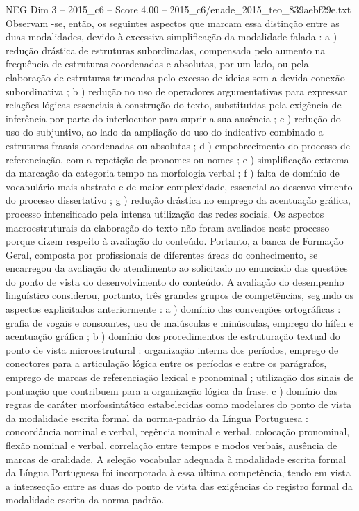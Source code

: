 \begin{textsample}{NEG Dim 3 – 2015\_c6 – Score 4.00 – 2015\_c6/enade\_2015\_teo\_839aebf29e.txt}
Observam -se, então, os seguintes aspectos que marcam essa distinção entre as duas modalidades, devido à excessiva simplificação da modalidade falada : a ) redução drástica de estruturas subordinadas, compensada pelo aumento na frequência de estruturas coordenadas e absolutas, por um lado, ou pela elaboração de estruturas truncadas pelo excesso de ideias sem a devida conexão subordinativa ; b ) redução no uso de operadores argumentativas para expressar relações lógicas essenciais à construção do texto, substituídas pela exigência de inferência por parte do interlocutor para suprir a sua ausência ; c ) redução do uso do subjuntivo, ao lado da ampliação do uso do indicativo combinado a estruturas frasais coordenadas ou absolutas ; d ) empobrecimento do processo de referenciação, com a repetição de pronomes ou nomes ; e ) simplificação extrema da marcação da categoria tempo na morfologia verbal ; f ) falta de domínio de vocabulário mais abstrato e de maior complexidade, essencial ao desenvolvimento do processo dissertativo ; g ) redução drástica no emprego da acentuação gráfica, processo intensificado pela intensa utilização das redes sociais.
Os aspectos macroestruturais da elaboração do texto não foram avaliados neste processo porque dizem respeito à avaliação do conteúdo.
Portanto, a banca de Formação Geral, composta por profissionais de diferentes áreas do conhecimento, se encarregou da avaliação do atendimento ao solicitado no enunciado das questões do ponto de vista do desenvolvimento do conteúdo.
A avaliação do desempenho linguístico considerou, portanto, três grandes grupos de competências, segundo os aspectos explicitados anteriormente : a ) domínio das convenções ortográficas : grafia de vogais e consoantes, uso de maiúsculas e minúsculas, emprego do hífen e acentuação gráfica ; b ) domínio dos procedimentos de estruturação textual do ponto de vista microestrutural : organização interna dos períodos, emprego de conectores para a articulação lógica entre os períodos e entre os parágrafos, emprego de marcas de referenciação lexical e pronominal ; utilização dos sinais de pontuação que contribuem para a organização lógica da frase. c ) domínio das regras de caráter morfossintático estabelecidas como modelares do ponto de vista da modalidade escrita formal da norma-padrão da Língua Portuguesa : concordância nominal e verbal, regência nominal e verbal, colocação pronominal, flexão nominal e verbal, correlação entre tempos e modos verbais, ausência de marcas de oralidade.
A seleção vocabular adequada à modalidade escrita formal da Língua Portuguesa foi incorporada à essa última competência, tendo em vista a intersecção entre as duas do ponto de vista das exigências do registro formal da modalidade escrita da norma-padrão.

\end{textsample}
